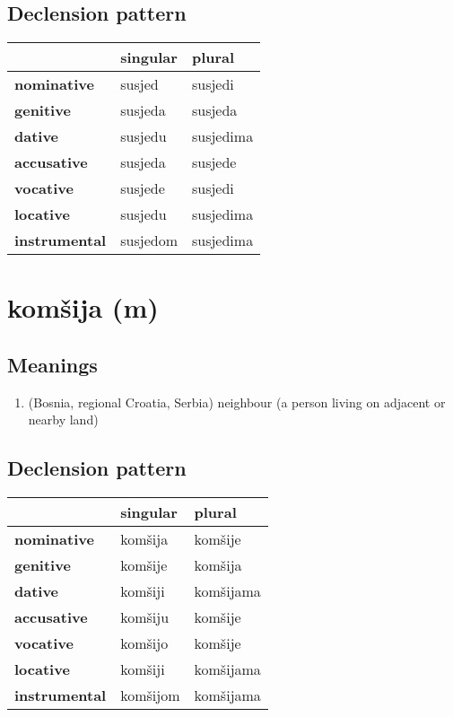 \subsection*{Declension pattern}
\begin{tabularx}{\linewidth}{Xll}
\toprule
{} &  singular &     plural \\
\midrule
\textbf{nominative  } &    susjed &    susjedi \\
\textbf{genitive    } &   susjeda &    susjeda \\
\textbf{dative      } &   susjedu &  susjedima \\
\textbf{accusative  } &   susjeda &    susjede \\
\textbf{vocative    } &   susjede &    susjedi \\
\textbf{locative    } &   susjedu &  susjedima \\
\textbf{instrumental} &  susjedom &  susjedima \\
\bottomrule
\end{tabularx}

\filbreak
\section{komšija (m)}
\subsection*{Meanings}
\begin{enumerate}
\item (Bosnia, regional  Croatia, Serbia) neighbour (a person living on adjacent or nearby land)
\end{enumerate}
\subsection*{Declension pattern}
\begin{tabularx}{\linewidth}{Xll}
\toprule
{} &  singular &     plural \\
\midrule
\textbf{nominative  } &   komšija &    komšije \\
\textbf{genitive    } &   komšije &    komšija \\
\textbf{dative      } &   komšiji &  komšijama \\
\textbf{accusative  } &   komšiju &    komšije \\
\textbf{vocative    } &   komšijo &    komšije \\
\textbf{locative    } &   komšiji &  komšijama \\
\textbf{instrumental} &  komšijom &  komšijama \\
\bottomrule
\end{tabularx}

